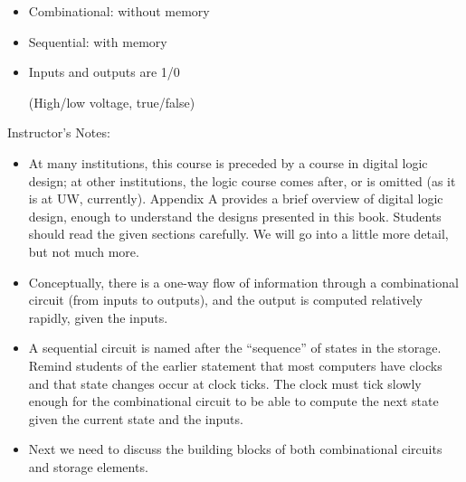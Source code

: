 
\begin{frame}[fragile]
\begin{itemize}
	\item Combinational: without memory
	\item Sequential: with memory
	\item Inputs and outputs are 1/0

		(High/low voltage, true/false)
\end{itemize}
\end{frame}
\BNotes\ifnum{}
\begin{frame}[fragile]
Instructor's Notes:
\begin{itemize}
\item At many institutions, this course is preceded by a course in
	digital logic design; at other institutions, the logic course comes
	after, or is omitted (as it is at UW, currently). Appendix A provides a
	brief overview of digital logic design, enough to understand the designs
	presented in this book. Students should read the given sections
	carefully. We will go into a little more detail, but not much more.
\item	Conceptually, there is a one-way flow of information through a
	combinational circuit (from inputs to outputs), and the output is
	computed relatively rapidly, given the inputs.
\item   A sequential circuit is named after the ``sequence'' of states
	in the storage. Remind students of the earlier statement that most
	computers have clocks and that state changes occur at clock ticks. The
	clock must tick slowly enough for the combinational circuit to be able
	to compute the next state given the current state and the inputs.
\item Next we need to discuss the building blocks of both
	combinational circuits and storage elements.
\end{itemize}
\end{frame}
\fi\ENotes

